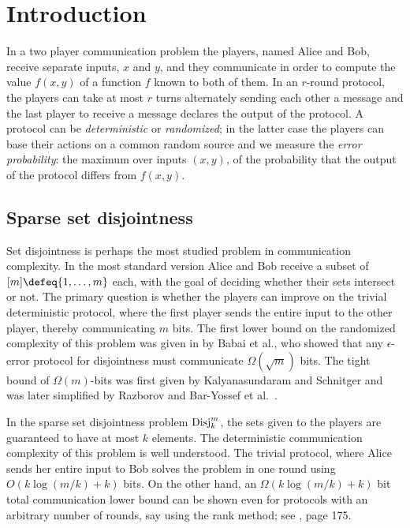 \section{Introduction}
In a two player communication problem the players, named Alice
and Bob, receive separate inputs, $x$ and $y$, and they
communicate in order to compute the value $f(x,y)$ of a function
$f$ known to both of them. 
In an $r$-round protocol, the players can take at most $r$
turns alternately sending each other a message and the last
player to receive a message declares the output of the protocol.
A protocol can be {\em deterministic} or {\em randomized}; in
the latter case the players can base their actions on a common
random source and we measure the {\em error probability}: the
maximum over inputs $(x,y)$, of the probability that the output
of the protocol differs from $f(x,y)$.

\subsection{Sparse set disjointness}
Set disjointness is perhaps the most studied problem in
communication complexity. In the most standard version Alice and
Bob receive a subset of $[m]\defeq\{1,\ldots,m\}$ each, with the
goal of deciding whether their sets intersect or not. The
primary question is whether the players can improve on the
trivial deterministic protocol, where the first player sends the
entire input to the other player, thereby communicating $m$
bits. The first lower bound on the randomized complexity of this
problem was given in \cite{BabaiFS1986} by Babai et al., who
showed that any $\epsilon$-error protocol for disjointness must
communicate $\Omega(\sqrt{m})$ bits. The tight bound of
$\Omega(m)$-bits was first given by Kalyanasundaram and
Schnitger \cite{KalyanasundaramS1992} and was later simplified by
Razborov \cite{Razborov1992} and Bar-Yossef et al.\
\cite{Bar-YossefJKS2004}.

In the sparse set disjointness problem $\operatorname{Disj}_k^m$, the sets
given to the players are guaranteed to have at most $k$
elements. The deterministic communication complexity of this
problem is well understood. The trivial protocol, where Alice
sends her entire input to Bob solves the problem in one round
using $O(k\log(m/k) + k)$ bits. On the other hand, an
$\Omega(k\log(m/k) + k)$ bit total communication lower bound can be
shown even for protocols with an arbitrary number of rounds, say
using the rank method; see \cite{KushilevitzN1997}, page 175.

